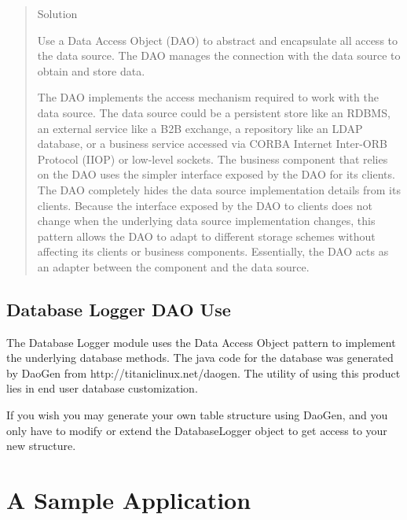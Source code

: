 \documentclass[11pt]{report}
\begin{document}
\begin{flushleft}
\begin{quote}
        \begin{bf}Solution\end{bf}

        Use a Data Access Object (DAO) to abstract and encapsulate all access
        to the data source. The DAO manages the connection with the data
        source to obtain and store data.

        The DAO implements the access mechanism required to work with the data
        source.  The data source could be a persistent store like an RDBMS, an
        external service like a B2B exchange, a repository like an LDAP
        database, or a business service accessed via CORBA Internet Inter-ORB
        Protocol (IIOP) or low-level sockets.  The business component that
        relies on the DAO uses the simpler interface exposed by the DAO for
        its clients. The DAO completely hides the data source implementation
        details from its clients. Because the interface exposed by the DAO to
        clients does not change when the underlying data source implementation
        changes, this pattern allows the DAO to adapt to different storage
        schemes without affecting its clients or business components.
        Essentially, the DAO acts as an adapter between the component and the
        data source.
    \end{quote}

    \section{Database Logger DAO Use}
    The Database Logger module uses the Data Access Object pattern to
    implement the underlying database methods.  The java code for the database
    was generated by DaoGen from http://titaniclinux.net/daogen.  The utility
    of using this product lies in end user database customization.  

    If you wish you may generate your own table structure using DaoGen, and
    you only have to modify or extend the DatabaseLogger object to get access
    to your new structure.  

\chapter{A Sample Application}

\end{flushleft}
\end{document}
